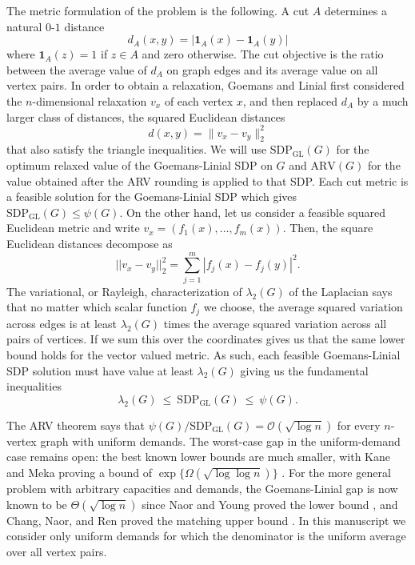 \documentclass[11pt]{article}
\theoremstyle{definition}
\theoremstyle{remark}
\newcommand{\one}{\mathbf{1}}
\newcommand{\gl}{\operatorname{SDP_{GL}}}
\begin{document}
The metric formulation of the problem is the following. A cut $A$ determines a natural $0$-$1$ distance
\[
  d_A(x,y)=|\one_{A}(x)-\one_{A}(y)|
\]
where $\one_A(z) = 1$ if $z \in A$ and zero otherwise. The cut objective is the ratio between the average value of $d_A$ on graph edges and its average value on all vertex pairs. In order to obtain a relaxation, Goemans and Linial first considered the $n$-dimensional relaxation $v_x$ of each vertex $x$, and then replaced $d_A$ by a much larger class of distances, the squared Euclidean distances
\[
  d(x,y)=\|v_x-v_y\|_2^2
\]
that also satisfy the triangle inequalities. We will use $\gl(G)$ for the optimum relaxed value of the Goemans-Linial SDP on  $G$ and $\mathrm{ARV}(G)$ for the value obtained after the ARV rounding is applied to that SDP. Each cut metric is a feasible solution for the Goemans-Linial SDP which gives $\gl(G) \leq \psi(G)$. On the other hand, let us consider a feasible squared Euclidean metric and  write $v_x = (f_1(x), \dots, f_m(x))$. Then, the square Euclidean distances decompose as
\[
||v_x - v_y||_2^2 = \sum_{j=1}^m |f_j(x) - f_j(y)|^2.
\]
The variational, or Rayleigh, characterization of $\lambda_2(G)$ of the Laplacian says that no matter which scalar function $f_j$ we choose, the average squared variation across edges is at least $\lambda_2(G)$ times the average squared variation across all pairs of vertices. If we sum this over the coordinates gives us that the same lower bound holds for the vector valued metric. As such, each feasible Goemans-Linial SDP solution must have value at least $\lambda_2(G)$ giving us the fundamental inequalities 
\begin{equation}\label{eq:fundamental-chain-intro}
  \lambda_2(G) ~\leq~ \gl(G) ~\leq~ \psi(G).
\end{equation}



The ARV theorem says that $\psi(G)/\gl(G)=\mathcal{O}(\sqrt{\log n})$ for every $n$-vertex graph with uniform demands. The  worst-case gap in the uniform-demand case remains open: the best known lower bounds are much smaller, with Kane and Meka proving a bound of $\exp\{\Omega(\sqrt{\log\log n})\}$ \cite{KM13}. For the more general problem with arbitrary capacities and demands, the Goemans-Linial gap is now known to be $\Theta(\sqrt{\log n})$ since Naor and Young proved the lower bound \cite{NY17}, and Chang, Naor, and Ren proved the matching upper bound \cite{CNR25}. In this manuscript we consider only uniform demands for which the denominator is the uniform average over all vertex pairs. 
\end{document}
